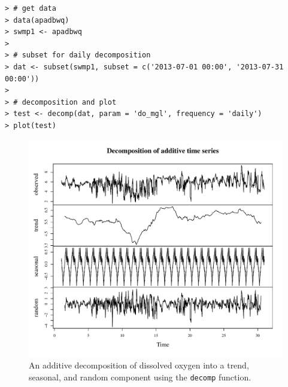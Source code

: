 \documentclass[10pt,letterpaper]{article}\usepackage[]{graphicx}\usepackage[]{color}
\makeatletter
\def\maxwidth{ %
  \ifdim\Gin@nat@width>\linewidth
    \linewidth
  \else
    \Gin@nat@width
  \fi
}
\newenvironment{kframe}{%
 \def\at@end@of@kframe{}%
 \ifinner\ifhmode%
  \def\at@end@of@kframe{\end{minipage}}%
  \begin{minipage}{\columnwidth}%
 \fi\fi%
 \def\FrameCommand##1{\hskip\@totalleftmargin \hskip-\fboxsep
 \colorbox{shadecolor}{##1}\hskip-\fboxsep
     \hskip-\linewidth \hskip-\@totalleftmargin \hskip\columnwidth}%
 \MakeFramed {\advance\hsize-\width
   \@totalleftmargin\z@ \linewidth\hsize
   \@setminipage}}%
 {\par\unskip\endMakeFramed%
 \at@end@of@kframe}
\newenvironment{knitrout}{}{} %
\makeatother
\begin{document}
\begin{knitrout}
\color{fgcolor}\begin{kframe}
\begin{verbatim}
> # get data
> data(apadbwq)
> swmp1 <- apadbwq
> 
> # subset for daily decomposition
> dat <- subset(swmp1, subset = c('2013-07-01 00:00', '2013-07-31 00:00'))
> 
> # decomposition and plot
> test <- decomp(dat, param = 'do_mgl', frequency = 'daily')
> plot(test)
\end{verbatim}
\end{kframe}\begin{figure}[!ht]


{\centering \includegraphics[width=\maxwidth]{figure/decomp_ex1} 

}

\caption[An additive decomposition of dissolved oxygen into a trend, seasonal, and random component using the \texttt{decomp} function]{An additive decomposition of dissolved oxygen into a trend, seasonal, and random component using the \texttt{decomp} function.\label{fig:decomp_ex1}}
\end{figure}


\end{knitrout}
\end{document}
